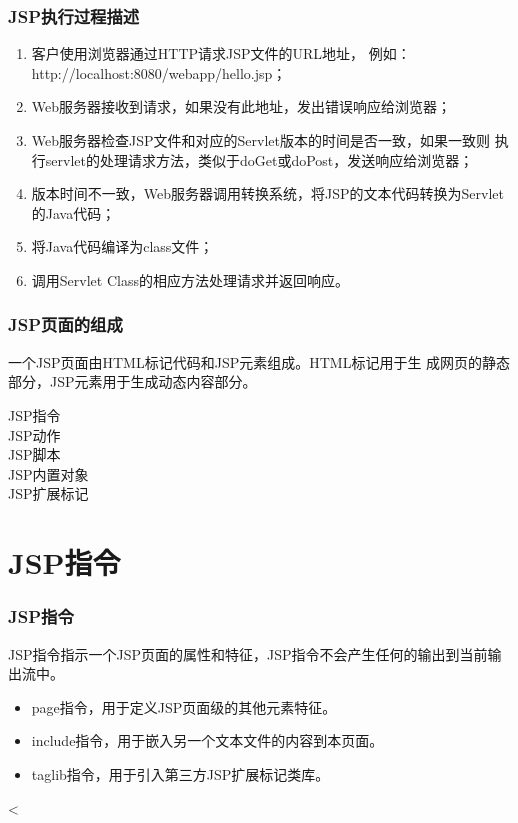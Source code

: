 \begin{frame}[fragile] %
  \frametitle{JSP执行过程描述} 

  \begin{enumerate}\kai
  \item 客户使用浏览器通过HTTP请求JSP文件的URL地址，
    例如：http://localhost:8080/webapp/hello.jsp；
  \item Web服务器接收到请求，如果没有此地址，发出错误响应给浏览器；
  \item Web服务器检查JSP文件和对应的Servlet版本的时间是否一致，如果一致则
    执行servlet的处理请求方法，类似于doGet或doPost，发送响应给浏览器；
  \item 版本时间不一致，Web服务器调用转换系统，将JSP的文本代码转换为Servlet的Java代码；
  \item 将Java代码编译为class文件；
  \item 调用Servlet Class的相应方法处理请求并返回响应。
  \end{enumerate}
\end{frame}

\begin{frame}[fragile] %
  \frametitle{JSP页面的组成} 

  一个JSP页面由{\hei HTML标记代码}和{\hei JSP元素}组成。HTML标记用于生
  成网页的静态部分，JSP元素用于生成动态内容部分。


  \begin{description}
  \item[JSP指令] 
  \item[JSP动作] 
  \item[JSP脚本] 
  \item[JSP内置对象] 
  \item[JSP扩展标记]
  \end{description}
\end{frame}

\section{JSP指令}

\begin{frame}[fragile] %
  \frametitle{JSP指令} 
  JSP指令指示一个JSP页面的属性和特征，JSP指令不会产生任何的输出到当前输出流中。

  \begin{itemize}
  \item page指令，用于定义JSP页面级的其他元素特征。
  \item include指令，用于嵌入另一个文本文件的内容到本页面。
  \item taglib指令，用于引入第三方JSP扩展标记类库。
  \end{itemize}


  \begin{jspCode}
    <%
  \end{jspCode}
  
\end{frame}

